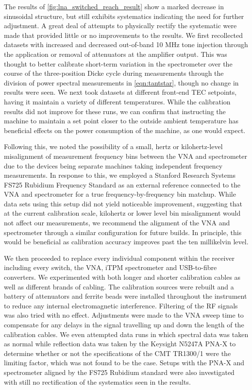The results of \cref{fig:lna_switched_reach_result} show a marked decrease in sinusoidal structure, but still exhibits systematics indicating the need for further adjustment. A great deal of attempts to physically rectify the systematic were made that provided little or no improvements to the results. We first recollected datasets with increased and decreased out-of-band 10 MHz tone injection through the application or removal of attenuators at the amplifier output. This was thought to better calibrate short-term variation in the spectrometer over the course of the three-position Dicke cycle during measurements through the division of power spectral measurements in \cref{eqn:tantstar}, though no change in results were seen. We next took datasets at different front-end TEC setpoints, having it maintain a variety of different temperatures. While the calibration results did not improve for these runs, we can confirm that instructing the machine to maintain a set point closer to the outside ambient temperature has beneficial effects on the power consumption of the machine, as one would expect.

Following this, we noted the possibility of a small, hertz or kilohertz-level misalignment of measurement frequency bins between the VNA and spectrometer due to the devices being separate machines taking independent frequency measurements. In response to this, we employed a Stanford Research Systems FS725 Rubidium Frequency Standard as an external reference connected to the VNA and spectrometer for a true frequency-by-frequency bin matchup. While data sets using this setup did not yield noticeable improvement, suggesting that at the current calibration scale, kilohertz or lower level bin misalignment would not affect our measurements, we recommend the alignment of the VNA and spectrometer through a similar configuration for future builds. In principle, this would be beneficial as calibration accuracy improves past the ten millikelvin level.

We then proceeded to replace every individual component within the receiver including every switch, the VNA, iTPM spectrometer and USB-to-fibre converters. We experimented with both longer and shorter calibration cables as well as different brands of cabling. The calibration sources were rebuilt and a battery of attenuators and ferrite beads were installed throughout the instrument to reduce any internal electromagnetic interference. Filtering of the RF signals was also tried with no effect. Adjustments were made to the VNA sweep time to compensate for any delays in the signal travelling up and down the length of the calibration cables. We even attempted data runs in which spectral data was taken as normal while reflection data was taken by the Keysight N5247A PNA-X to determine whether or not the specifications of the CMT TR1300/1 were the limiting factor, which was not found to be the case. Setups with the PNA-X and spectrometer aligned by the FS725 Rubidium standard were also investigated with still no rectification of the systematics seen in the results.

